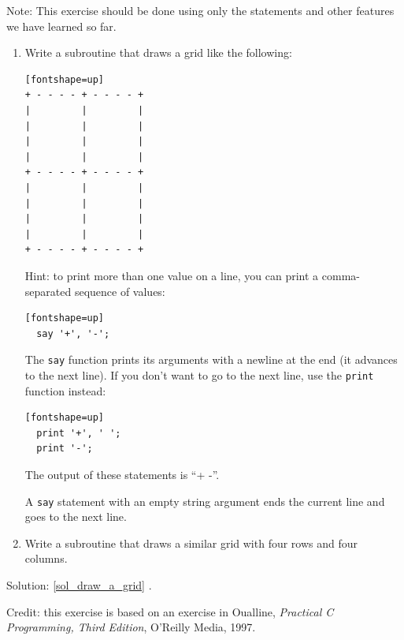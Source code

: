 \begin{exercise}
\label{draw_a_grid}

Note: This exercise should be
done using only the statements and other features we 
have learned so far.  

\begin{enumerate}

\item Write a subroutine that draws a grid like the following:

\begin{verbatim}[fontshape=up]
+ - - - - + - - - - +
|         |         |
|         |         |
|         |         |
|         |         |
+ - - - - + - - - - +
|         |         |
|         |         |
|         |         |
|         |         |
+ - - - - + - - - - +
\end{verbatim}
%
Hint: to print more than one value on a line, you can print
a comma-separated sequence of values:

\begin{verbatim}[fontshape=up]
  say '+', '-';
\end{verbatim}
%
The {\tt say} function prints its arguments with a newline at the end (it advances to the next line). If you don't want to 
go to the next line, use the {\tt print} function instead:


\begin{verbatim}[fontshape=up]
  print '+', ' ';
  print '-';
\end{verbatim}
%
The output of these statements is ``+ -''.

A {\tt say} statement with an empty string argument ends 
the current line and goes to the next line.

\item Write a subroutine that draws a similar grid
with four rows and four columns.

\end{enumerate}

Solution: \ref{sol_draw_a_grid}
.

Credit: this exercise is based on an exercise in Oualline, {\em
    Practical C Programming, Third Edition}, O'Reilly Media, 1997.

\end{exercise}

